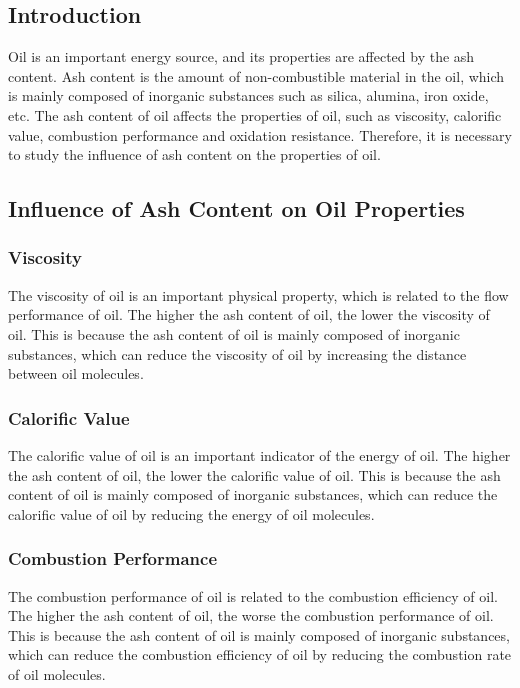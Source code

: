\documentclass[titlepage,oneside]{ctexbook}
\begin{document}
\subsection*{Introduction}

Oil is an important energy source, and its properties are affected by the ash content. Ash content is the amount of non-combustible material in the oil, which is mainly composed of inorganic substances such as silica, alumina, iron oxide, etc. The ash content of oil affects the properties of oil, such as viscosity, calorific value, combustion performance and oxidation resistance. Therefore, it is necessary to study the influence of ash content on the properties of oil.

\subsection*{Influence of Ash Content on Oil Properties}

\subsubsection*{Viscosity}
The viscosity of oil is an important physical property, which is related to the flow performance of oil. The higher the ash content of oil, the lower the viscosity of oil. This is because the ash content of oil is mainly composed of inorganic substances, which can reduce the viscosity of oil by increasing the distance between oil molecules.

\subsubsection*{Calorific Value}

The calorific value of oil is an important indicator of the energy of oil. The higher the ash content of oil, the lower the calorific value of oil. This is because the ash content of oil is mainly composed of inorganic substances, which can reduce the calorific value of oil by reducing the energy of oil molecules.

\subsubsection*{Combustion Performance}

The combustion performance of oil is related to the combustion efficiency of oil. The higher the ash content of oil, the worse the combustion performance of oil. This is because the ash content of oil is mainly composed of inorganic substances, which can reduce the combustion efficiency of oil by reducing the combustion rate of oil molecules.
\end{document}
